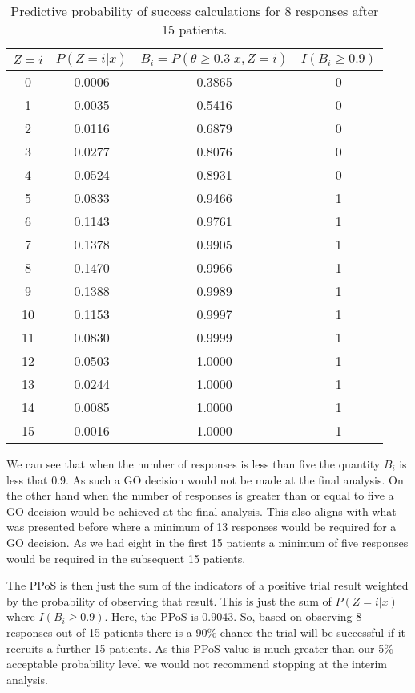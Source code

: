 \begin{table}[h!]
	\caption{\label{tab_etp:bb_ppos_8resp}Predictive probability of success calculations for 8 responses after 15 patients.}
	\centering
	\begin{tabular}[t]{cccc}
		\toprule
		$Z = i$ & $P(Z = i|x)$ & $B_i = P(\theta \geq 0.3 |x, Z=i)$ & $I(B_i \geq 0.9)$\\
		\midrule
		0 & 0.0006 & 0.3865 & 0\\
		1 & 0.0035 & 0.5416 & 0\\
		2 & 0.0116 & 0.6879 & 0\\
		3 & 0.0277 & 0.8076 & 0\\
		4 & 0.0524 & 0.8931 & 0\\
		5 & 0.0833 & 0.9466 & 1\\
		6 & 0.1143 & 0.9761 & 1\\
		7 & 0.1378 & 0.9905 & 1\\
		8 & 0.1470 & 0.9966 & 1\\
		9 & 0.1388 & 0.9989 & 1\\
		10 & 0.1153 & 0.9997 & 1\\
		11 & 0.0830 & 0.9999 & 1\\
		12 & 0.0503 & 1.0000 & 1\\
		13 & 0.0244 & 1.0000 & 1\\
		14 & 0.0085 & 1.0000 & 1\\
		15 & 0.0016 & 1.0000 & 1\\
		\bottomrule
	\end{tabular}
\end{table}

We can see that when the number of responses is less than five the quantity $B_i$ is less that 0.9. As such a GO decision would not be made at the final analysis. On the other hand when the number of responses is greater than or equal to five a GO decision would be achieved at the final analysis. This also aligns with what was presented before where a minimum of 13 responses would be required for a GO decision. As we had eight in the first 15 patients a minimum of five responses would be required in the subsequent 15 patients. 

The PPoS is then just the sum of the indicators of a positive trial result weighted by the probability of observing that result. This is just the sum of $P(Z = i|x)$ where $I(B_i \geq 0.9)$. Here, the PPoS is 0.9043. So, based on observing 8 responses out of 15 patients there is a 90\% chance the trial will be successful if it recruits a further 15 patients. As this PPoS value is much greater than our 5\% acceptable probability level we would not recommend stopping at the interim analysis. 

